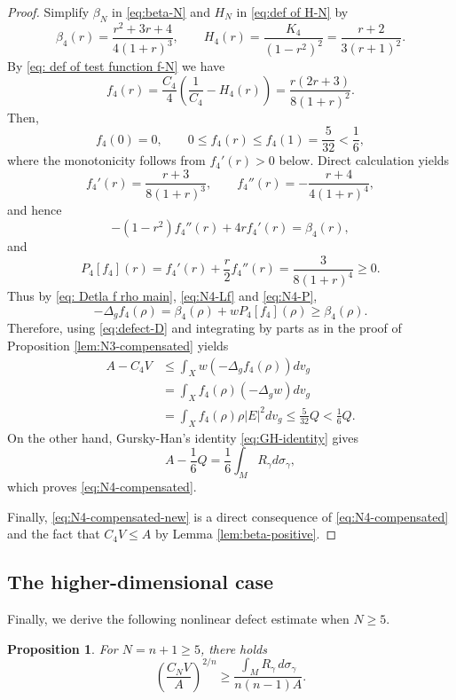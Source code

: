 \documentclass[11pt,letterpaper]{amsart}
\newtheorem{proposition}[theorem]{Proposition}
\theoremstyle{definition}
\theoremstyle{remark}
\numberwithin{equation}{section}
\begin{document}
\begin{proof}
Simplify $\beta_N$ in \eqref{eq:beta-N} and $H_N$ in \eqref{eq:def of H-N} by 
\begin{equation}\label{eq:N4-beta}
 \beta_4(r)=\frac{r^2+3r+4}{4(1+r)^3}, \qquad H_4(r)=\frac{K_4}{(1-r^2)^{2}}=\frac{r+2}{3(r+1)^2}.
\end{equation}
By \eqref{eq: def of test function f-N} we have
\begin{equation}\label{eq:N4-f}
f_4(r)=\frac{C_4}{4}\left(\frac{1}{C_4}-H_4(r)\right)=\frac{r(2r+3)}{8(1+r)^2}.
\end{equation}
Then,
\[
 f_4(0)=0,
 \qquad
 0\le f_4(r)\le f_4(1)=\frac5{32}<\frac16,
\]
 where the monotonicity follows from $f_4'(r)>0$ below. Direct calculation yields
\[
 f_4'(r)=\frac{r+3}{8(1+r)^3},
 \qquad
 f_4''(r)= -\frac{r+4}{4(1+r)^4},
\]
and hence
\begin{equation}\label{eq:N4-Lf}
 -(1-r^2)f_4''(r)+4rf_4'(r)=\beta_4(r),
\end{equation}
and
\begin{equation}\label{eq:N4-P}
 P_4[f_4](r)=f_4'(r)+\frac r2f_4''(r)=\frac3{8(1+r)^4}\ge0.
\end{equation}
Thus by \eqref{eq: Detla f rho main}, \eqref{eq:N4-Lf} and \eqref{eq:N4-P},
\[
 -\Delta_gf_4(\rho)=\beta_4(\rho)+wP_4[f_4](\rho)\ge\beta_4(\rho).
\]
Therefore, using \eqref{eq:defect-D} and integrating by parts as in the proof of Proposition \ref{lem:N3-compensated} yields
\[
 \begin{aligned}
A-C_4 V & \leq \int_X w\left(-\Delta_g f_4(\rho)\right) d v_g \\
& =\int_X f_4(\rho)\left(-\Delta_g w\right) d v_g \\
& =\int_X f_4(\rho) \rho|E|^2 d v_g \leq \frac{5}{32} Q<\frac{1}{6} Q.
\end{aligned}
\]
On the other hand,  Gursky-Han's  identity \eqref{eq:GH-identity} gives
\[
A-\frac{1}{6} Q=\frac{1}{6} \int_M R_\gamma d \sigma_\gamma,
\]
which proves \eqref{eq:N4-compensated}. 

Finally, \eqref{eq:N4-compensated-new} is a direct consequence of \eqref{eq:N4-compensated} and the fact that $C_4 V \leq A$ by Lemma \ref{lem:beta-positive}.
\end{proof}
\subsection{The higher-dimensional case}
Finally, we derive the following nonlinear defect estimate when $N\ge5$.
\begin{proposition}\label{prop:power-bridge}
For $N=n+1\ge5$, there holds
\begin{equation}\label{eq:power-bridge}
 \left(\frac{C_NV}{A}\right)^{2/n}
 \ge
 \frac{\displaystyle\int_MR_\gamma\,d\sigma_\gamma}{n(n-1)A}.
\end{equation}
\end{proposition}
\end{document}
